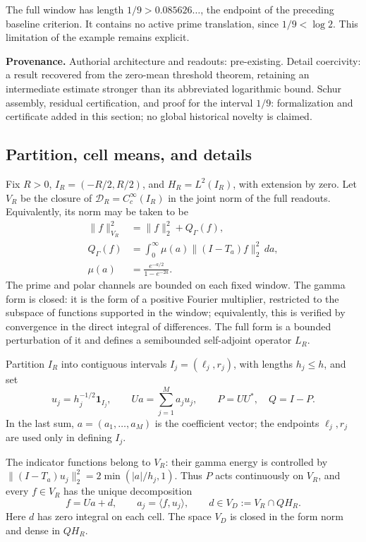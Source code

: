 The full window has length \(1/9>0.085626\ldots\), the endpoint
of the preceding baseline criterion. It contains no active prime translation,
since \(1/9<\log2\). This limitation of the example remains explicit.

\textbf{Provenance.} Authorial architecture and readouts: pre-existing. Detail
coercivity: a result recovered from the zero-mean threshold theorem, retaining an
intermediate estimate stronger than its abbreviated logarithmic bound. Schur assembly,
residual certification, and proof for the interval \(1/9\): formalization and
certificate added in this section; no global historical novelty is claimed.

\subsection{Partition, cell means, and details}
\label{schur-add-sub-46}

Fix \(R>0\), \(I_R=(-R/2,R/2)\), and \(H_R=L^2(I_R)\), with extension
by zero. Let \(V_R\) be the closure of \(\mathcal D_R=C_c^\infty(I_R)\) in the
joint norm of the full readouts. Equivalently, its norm may be taken to be
\begin{equation}
\begin{aligned}
\|f\|_{V_R}^2&=\|f\|_2^2+Q_\Gamma(f),\\
Q_\Gamma(f)&=\int_0^\infty\mu(a)\|(I-T_a)f\|_2^2\,da,\\
\mu(a)&=\frac{e^{-a/2}}{1-e^{-2a}}.
\end{aligned}
\label{schur-add-display-2}
\end{equation}
The prime and polar channels are bounded on each fixed window.
The gamma form is closed: it is the form of a positive Fourier
multiplier, restricted to the subspace of functions supported in the
window; equivalently, this is verified by convergence in the
direct integral of differences. The full form is a bounded perturbation
of it and defines a semibounded self-adjoint operator \(L_R\).

Partition \(I_R\) into contiguous intervals \(I_j=(\ell_j,r_j)\), with
lengths \(h_j\leq h\), and set
\begin{equation}
u_j=h_j^{-1/2}\mathbf1_{I_j},\qquad
Ua=\sum_{j=1}^M a_j u_j,\qquad P=UU^*,\quad Q=I-P.
\label{schur-add-display-3}
\end{equation}
In the last sum, \(a=(a_1,\ldots,a_M)\) is the coefficient vector;
the endpoints \(\ell_j,r_j\) are used only in defining \(I_j\).

The indicator functions belong to \(V_R\): their gamma energy is controlled by
\(\|(I-T_a)u_j\|_2^2=2\min(|a|/h_j,1)\). Thus \(P\) acts
continuously on \(V_R\), and every \(f\in V_R\) has the unique decomposition
\begin{equation}
f=Ua+d,\qquad a_j=\langle f,u_j\rangle,\qquad
d\in V_D:=V_R\cap QH_R.
\label{schur-add-display-4}
\end{equation}
Here \(d\) has zero integral on each cell. The space \(V_D\) is
closed in the form norm and dense in \(QH_R\).

